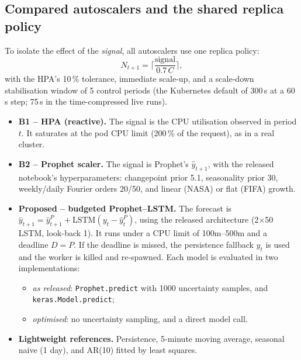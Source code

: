 \documentclass[11pt,a4paper]{article}
\begin{document}
\subsection{Compared autoscalers and the shared replica policy}
To isolate the effect of the \emph{signal}, all autoscalers use one replica policy:
\[
  N_{t+1}=\Big\lceil \frac{\text{signal}}{0.7\,C} \Big\rceil,
\]
with the HPA's 10\,\% tolerance, immediate scale-up, and a scale-down stabilisation window of 5 control periods
(the Kubernetes default of 300\,s at a 60\,s step; 75\,s in the time-compressed live runs).
\begin{itemize}
\item \textbf{B1 -- HPA (reactive).} The signal is the CPU utilisation observed in period $t$. It saturates at
      the pod CPU limit (200\,\% of the request), as in a real cluster.
\item \textbf{B2 -- Prophet scaler.} The signal is Prophet's $\hat y_{t+1}$, with the released notebook's
      hyperparameters: changepoint prior 5.1, seasonality prior 30, weekly/daily Fourier orders 20/50, and
      linear (NASA) or flat (FIFA) growth.
\item \textbf{Proposed -- budgeted Prophet--LSTM.} The forecast is
      $\hat y_{t+1} = \hat y^{P}_{t+1} + \mathrm{LSTM}(y_t-\hat y^{P}_t)$, using the released architecture
      (2$\times$50 LSTM, look-back 1). It runs under a CPU limit of 100m--500m and a deadline $D=P$. If the
      deadline is missed, the persistence fallback $y_t$ is used and the worker is killed and re-spawned.
      Each model is evaluated in two implementations:
      \begin{itemize}
      \item \emph{as released}: \texttt{Prophet.predict} with 1000 uncertainty samples, and
            \texttt{keras.Model.predict};
      \item \emph{optimised}: no uncertainty sampling, and a direct model call.
      \end{itemize}
\item \textbf{Lightweight references.} Persistence, 5-minute moving average, seasonal naive (1 day), and
      AR(10) fitted by least squares.
\end{itemize}
\end{document}
